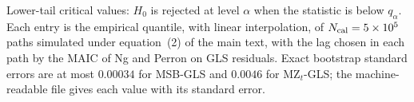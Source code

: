Lower-tail critical values: $H_0$ is rejected at level $\alpha$ when the statistic is below $q_\alpha$. Each entry is the empirical quantile, with linear interpolation, of $N_{\mathrm{cal}} = 5\times10^{5}$ paths simulated under equation~(2) of the main text, with the lag chosen in each path by the MAIC of Ng and Perron on GLS residuals. Exact bootstrap standard errors are at most $0.00034$ for MSB-GLS and $0.0046$ for MZ$_t$-GLS; the machine-readable file gives each value with its standard error.
